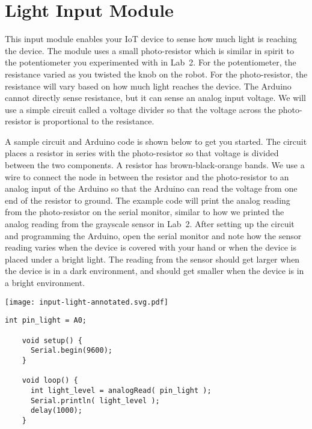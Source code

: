 
\clearpage
\section{Light Input Module}
\label{sec-input-light}

This input module enables your IoT device to sense how much light is
reaching the device. The module uses a small photo-resistor which is
similar in spirit to the potentiometer you experimented with in Lab~2.
For the potentiometer, the resistance varied as you twisted the knob on
the robot. For the photo-resistor, the resistance will vary based on how
much light reaches the device. The Arduino cannot directly sense
resistance, but it can sense an analog input voltage. We will use a
simple circuit called a voltage divider so that the voltage across the
photo-resistor is proportional to the resistance.

A sample circuit and Arduino code is shown below to get you started. The
circuit places a  resistor in series with the
photo-resistor so that voltage is divided between the two components. A
 resistor has brown-black-orange bands. We use a wire
to connect the node in between the resistor and the photo-resistor to an
analog input of the Arduino so that the Arduino can read the voltage
from one end of the  resistor to ground. The example
code will print the analog reading from the photo-resistor on the serial
monitor, similar to how we printed the analog reading from the grayscale
sensor in Lab~2. After setting up the circuit and programming the
Arduino, open the serial monitor and note how the sensor reading varies
when the device is covered with your hand or when the device is placed
under a bright light.  The reading from the sensor should get larger
when the device is in a dark environment, and should get smaller when
the device is in a bright environment.

\vspace{0.1in}
\begin{minipage}[t]{0.49\tw}
  \vspace{0pt}

  \texttt{[image: input-light-annotated.svg.pdf]}
\end{minipage}
\hfill
\begin{minipage}[t]{0.49\tw}
  \vspace{0.1in}
  \begin{Verbatim}[gobble=3,fontsize=\small]
    int pin_light = A0;

    void setup() {
      Serial.begin(9600);
    }

    void loop() {
      int light_level = analogRead( pin_light );
      Serial.println( light_level );
      delay(1000);
    }
  \end{Verbatim}
\end{minipage}


